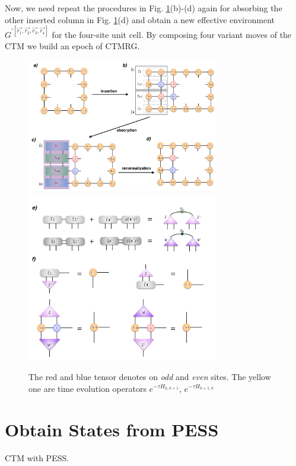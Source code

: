 Now, we need repeat the procedures in Fig. \ref{fig512}(b)-(d) again for absorbing the other inserted column in Fig. \ref{fig512}(d) and obtain a new effective environment $G^{\prime \left[\vec{r_1},\vec{r_2},\vec{r_3},\vec{r_4}\right]}$ for the four-site unit cell. By composing four variant moves of the CTM we build an epoch of CTMRG. 

\begin{figure}[ht]
	\centering
	\includegraphics[width=0.75\textwidth]{figures/fig512.png}
	\includegraphics[width=0.75\textwidth]{figures/fig513.png}
	\caption[The picture of the main idea of itebd.]{The red and blue tensor denotes on \textit{odd} and \textit{even} sites. The yellow one are time evolution operators $e^{-\tau H_{k,k+1}}$, $e^{-\tau H_{k+1,k}}$}
	\label{fig512}
\end{figure}

\section{Obtain States from PESS}
\label{pessctm}
CTM with PESS.
